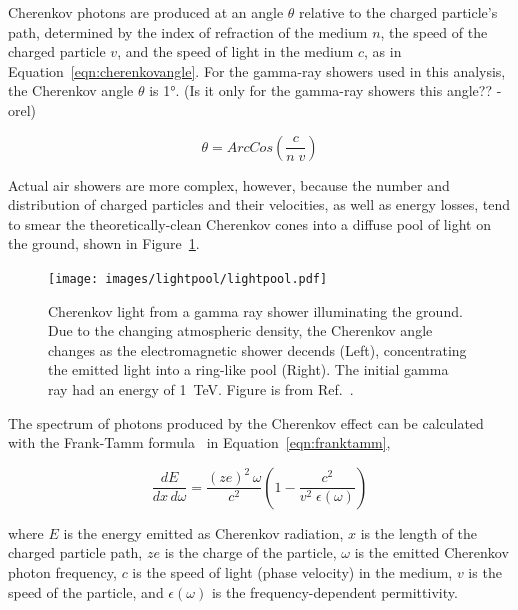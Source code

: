   Cherenkov photons are produced at an angle $\theta$ relative to the charged particle's path, determined by the index of refraction of the medium $n$, the speed of the charged particle $v$, and the speed of light in the medium $c$, as in Equation~\ref{eqn:cherenkovangle}.
  For the gamma-ray showers used in this analysis, the Cherenkov angle $\theta$ is \nicetilde\ang{1}.
  {\color{red}(Is it only for the gamma-ray showers this angle?? -orel)}

  \begin{equation}\label{eqn:cherenkovangle}
    \theta = ArcCos \left ( \frac{c}{n \; v} \right )
  \end{equation}
  
  Actual air showers are more complex, however, because the number and distribution of charged particles and their velocities, as well as energy losses, tend to smear the theoretically-clean Cherenkov cones into a diffuse pool of light on the ground, shown in Figure~\ref{fig:lightpool}.

  \begin{figure}[ht]
    \centering
    \texttt{[image: images/lightpool/lightpool.pdf]}
    \caption[Chernekov Light Pool]{
      Cherenkov light from a gamma ray shower illuminating the ground.
      Due to the changing atmospheric density, the Cherenkov angle changes as the electromagnetic shower decends (Left), concentrating the emitted light into a ring-like pool (Right).
      The initial gamma ray had an energy of \SI{1}{\TeV}.
      Figure is from Ref.~\cite{Voelk}.
    }
    \label{fig:lightpool}
  \end{figure}
  
  The spectrum of photons produced by the Cherenkov effect can be calculated with the Frank-Tamm formula~\cite{franktamm1,franktamm2} in Equation~\ref{eqn:franktamm},
  
  \begin{equation}\label{eqn:franktamm}
    \frac{dE}{dx\,d\omega}=\frac{(ze)^2 \, \omega}{c^2} \left ( 1 - \frac{c^2}{v^2 \;\epsilon(\omega)} \right )
  \end{equation}
  
  where $E$ is the energy emitted as Cherenkov radiation, $x$ is the length of the charged particle path, $ze$ is the charge of the particle, $\omega$ is the emitted Cherenkov photon frequency, $c$ is the speed of light (phase velocity) in the medium, $v$ is the speed of the particle, and $\epsilon(\omega)$ is the frequency-dependent permittivity.
  
